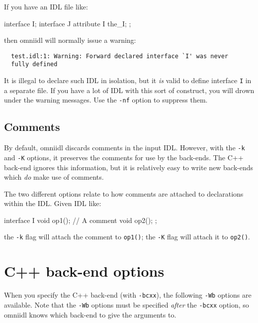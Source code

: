 \documentclass[11pt,twoside,a4paper]{book}
\newcommand{\intf}[1]{\texttt{#1}}
\newcommand{\op}[1]{\texttt{#1()}}
\newcommand{\cmdline}[1]{\texttt{#1}}
\begin{document}
If you have an IDL file like:

\begin{idllisting}
interface I;
interface J {
  attribute I the_I;
};
\end{idllisting}

\noindent then omniidl will normally issue a warning:

{\small
\begin{verbatim}
  test.idl:1: Warning: Forward declared interface `I' was never
  fully defined
\end{verbatim}
}

\noindent It is illegal to declare such IDL in isolation, but it
\emph{is} valid to define interface \intf{I} in a separate file. If
you have a lot of IDL with this sort of construct, you will drown
under the warning messages. Use the \cmdline{-nf} option to suppress
them.


\subsection{Comments}

By default, omniidl discards comments in the input IDL. However, with
the \cmdline{-k} and \cmdline{-K} options, it preserves the comments
for use by the back-ends. The C++ back-end ignores this information,
but it is relatively easy to write new back-ends which \emph{do} make
use of comments.

The two different options relate to how comments are attached to
declarations within the IDL. Given IDL like:

\begin{idllisting}
interface I {
  void op1();
  // A comment
  void op2();
};
\end{idllisting}

\noindent the \cmdline{-k} flag will attach the comment to \op{op1};
the \cmdline{-K} flag will attach it to \op{op2}.



\section{C++ back-end options}

When you specify the C++ back-end (with \cmdline{-bcxx}), the
following \cmdline{-Wb} options are available. Note that the
\cmdline{-Wb} options must be specified \emph{after} the
\cmdline{-bcxx} option, so omniidl knows which back-end to give the
arguments to.
\end{document}
